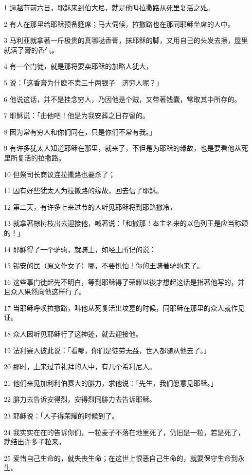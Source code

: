 \par 1 逾越节前六日，耶稣来到伯大尼，就是他叫拉撒路从死里复活之处。
\par 2 有人在那里给耶稣预备筵席；马大伺候，拉撒路也在那同耶稣坐席的人中。
\par 3 马利亚就拿著一斤极贵的真哪哒香膏，抹耶稣的脚，又用自己的头发去擦，屋里就满了膏的香气。
\par 4 有一个门徒，就是那将要卖耶稣的加略人犹大，
\par 5 说：「这香膏为什麽不卖三十两银子　济穷人呢？」
\par 6 他说这话，并不是挂念穷人，乃因他是个贼，又带著钱囊，常取其中所存的。
\par 7 耶稣说：「由他吧！他是为我安葬之日存留的。
\par 8 因为常有穷人和你们同在，只是你们不常有我。」
\par 9 有许多犹太人知道耶稣在那里，就来了，不但是为耶稣的缘故，也是要看他从死里所复活的拉撒路。
\par 10 但祭司长商议连拉撒路也要杀了；
\par 11 因有好些犹太人为拉撒路的缘故，回去信了耶稣。
\par 12 第二天，有许多上来过节的人听见耶稣将到耶路撒冷，
\par 13 就拿著棕树枝出去迎接他，喊著说：「和撒那！奉主名来的以色列王是应当称颂的！」
\par 14 耶稣得了一个驴驹，就骑上，如经上所记的说：
\par 15 锡安的民（原文作女子）哪，不要惧怕！你的王骑著驴驹来了。
\par 16 这些事门徒起先不明白，等到耶稣得了荣耀以後才想起这话是指著他写的，并且众人果然向他这样行了。
\par 17 当耶稣呼唤拉撒路，叫他从死复活出坟墓的时候，同耶稣在那里的众人就作见证。
\par 18 众人因听见耶稣行了这神迹，就去迎接他。
\par 19 法利赛人彼此说：「看哪，你们是徒劳无益，世人都随从他去了。」
\par 20 那时，上来过节礼拜的人中，有几个希利尼人。
\par 21 他们来见加利利伯赛大的腓力，求他说：「先生，我们愿意见耶稣。」
\par 22 腓力去告诉安得烈，安得烈同腓力去告诉耶稣。
\par 23 耶稣说：「人子得荣耀的时候到了。
\par 24 我实实在在的告诉你们，一粒麦子不落在地里死了，仍旧是一粒，若是死了，就结出许多子粒来。
\par 25 爱惜自己生命的，就失丧生命；在这世上恨恶自己生命的，就要保守生命到永生。
